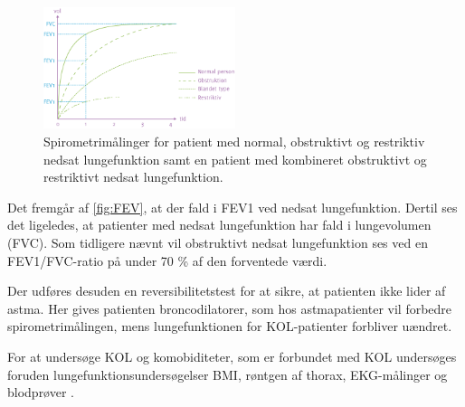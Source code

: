 \begin{figure} [H]
\centering
\includegraphics[width=0.5\textwidth]{figures/FEV}
\caption{Spirometrimålinger for patient med normal, obstruktivt og restriktiv nedsat lungefunktion samt en patient med kombineret obstruktivt og restriktivt nedsat lungefunktion.}
\label{fig:FEV}
\end{figure} 

Det fremgår af \autoref{fig:FEV}, at der fald i FEV1 ved nedsat lungefunktion. Dertil ses det ligeledes, at patienter med nedsat lungefunktion har fald i lungevolumen (FVC). Som tidligere nævnt vil obstruktivt nedsat lungefunktion ses ved en FEV1/FVC-ratio på under 70 \% af den forventede værdi. 

Der udføres desuden en reversibilitetstest for at sikre, at patienten ikke lider af astma. Her gives patienten broncodilatorer, som hos astmapatienter vil forbedre spirometrimålingen, mens lungefunktionen for KOL-patienter forbliver uændret.\cite{Basisbogen2016, Sundhed2013} 

For at undersøge KOL og komobiditeter, som er forbundet med KOL undersøges foruden lungefunktionsundersøgelser BMI, røntgen af thorax, EKG-målinger og blodprøver \cite{Sundhed2013}. 
